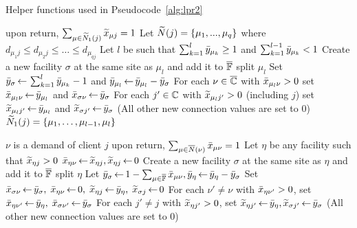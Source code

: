 \documentclass[oneside,final]{ucr}
\def\dsp{\def\baselinestretch{2.0}\large\normalsize}
\begin{document}
\begin{algorithm}[ht]
  \caption{Helper functions used in Pseudocode~\ref{alg:lpr2}}
  \label{alg:helper}
  \begin{algorithmic}[1]
						\Comment upon return, $\sum_{\mu\in{\widetilde N}_1(j)} {\widetilde x}_{\mu j} = 1$
    \State Let ${\widetilde N}(j) = \{\mu_1,...,\mu_{q}\}$ where $d_{\mu_1 j} \leq d_{\mu_2 j} \leq \ldots \leq d_{\mu_{q j}}$
    \State Let $l$ be such that $\sum_{k=1}^{l} {\bar y}_{\mu_k} \geq 1$ and $\sum_{k=1}^{l -1} {\bar y}_{\mu_{k}} < 1$
    \State Create a new facility $\sigma$ at the same site as $\mu_l$ and add it to $\overline{\mathbb{F}}$
			\Comment split $\mu_l$
    \State Set ${\bar y}_{\sigma}{\,\leftarrow\,} \sum_{k=1}^{l} {\bar y}_{\mu_{k}}-1$
					and ${\bar y}_{\mu_l} {\,\leftarrow\,} {\bar y}_{\mu_l} - {\bar y}_{\sigma}$
    \State For each $\nu\in\overline{\mathbb{C}}$ with ${\bar x}_{\mu_{l}\nu}>0$
 			set ${\bar x}_{\mu_{l}\nu} {\,\leftarrow\,} {\bar y}_{\mu_l}$ and ${\bar x}_{\sigma \nu} {\,\leftarrow\,} {\bar y}_{\sigma}$
    \State For each $j'\in\mathbb{C}$ with ${\widetilde x}_{\mu_{l} j'}>0$ (including $j$)
			set ${\widetilde x}_{\mu_l j'} {\,\leftarrow\,} {\bar y}_{\mu_l}$ and ${\widetilde x}_{\sigma j'} {\,\leftarrow\,} {\bar y}_\sigma$
	\State (All other new connection values are set to $0$)
    \State \Return ${\widetilde N}_1(j) = \{\mu_{1},\ldots,\mu_{l-1}, \mu_{l}\}$    				
    \EndFunction

    					\Comment $\nu$ is a demand of client $j$
    					\Comment upon return, $\sum_{\mu\in{\overline{N}}(\nu)} {\bar x}_{\mu\nu} = 1$
    \State Let $\eta$ be any facility such that ${\widetilde x}_{\eta j} > 0$
    \State ${\bar x}_{\eta\nu} {\,\leftarrow\,} {\widetilde x}_{\eta j}, {\widetilde x}_{\eta j} {\,\leftarrow\,} 0$
    \Else
    \State Create a new facility $\sigma$ at the same site as $\eta$ and add it to $\overline{\mathbb{F}}$
    					\Comment split $\eta$
    \State Let ${\bar y}_\sigma {\,\leftarrow\,} 1-\sum_{\mu\in \overline{\mathbb{F}}} {\bar x}_{\mu\nu}, {\bar y}_{\eta} {\,\leftarrow\,} {\bar y}_{\eta} - {\bar y}_{\sigma}$
    \State Set ${\bar x}_{\sigma\nu}{\,\leftarrow\,} {\bar y}_{\sigma},\; {\bar x}_{\eta \nu} {\,\leftarrow\,}  0,\; {\widetilde x}_{\eta j} {\,\leftarrow\,} {\bar y}_{\eta}, \; {\widetilde x}_{\sigma j} {\,\leftarrow\,} 0$
    \State For each $\nu' \neq \nu$ with ${\bar x}_{\eta \nu'}>0$, set ${\bar x}_{\eta \nu'} {\,\leftarrow\,} {\bar y}_{\eta},\; {\bar x}_{\sigma \nu'} {\,\leftarrow\,} {\bar y}_{\sigma}$
    \State For each $j' \neq j$ with ${\widetilde x}_{\eta j'}>0$, set ${\widetilde x}_{\eta j'} {\,\leftarrow\,} {\bar y}_{\eta}, {\widetilde x}_{\sigma j'} {\,\leftarrow\,} {\bar y}_{\sigma}$
	\State  (All other new connection values are set to $0$)
    \EndIf
    \EndWhile
    \EndFunction
  \end{algorithmic}
\end{algorithm}
\dsp
\end{document}
